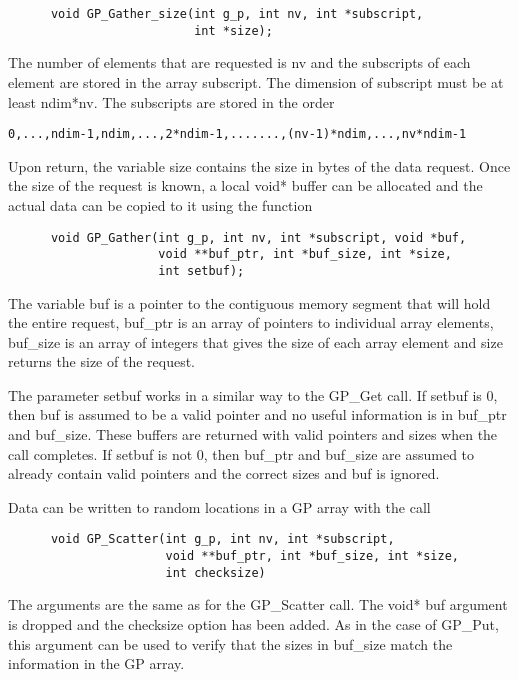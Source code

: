 \begin{verbatim}
      void GP_Gather_size(int g_p, int nv, int *subscript,
                          int *size);
\end{verbatim}

\noindent
The number of elements that are requested is nv and the subscripts of each
element are stored in the array subscript. The dimension of subscript must be at
least ndim*nv. The subscripts are stored in the order

\begin{verbatim}
0,...,ndim-1,ndim,...,2*ndim-1,.......,(nv-1)*ndim,...,nv*ndim-1
\end{verbatim}

\noindent
Upon return, the variable size contains the size in bytes of the data request.
Once the size of the request is known, a local void* buffer can be allocated and
the actual data can be copied to it using the function

\begin{verbatim}
      void GP_Gather(int g_p, int nv, int *subscript, void *buf,
                     void **buf_ptr, int *buf_size, int *size,
                     int setbuf);
\end{verbatim}

\noindent
The variable buf is a pointer to the contiguous memory segment that will hold
the entire request, buf\_ptr is an array of pointers to individual array
elements, buf\_size is an array of integers that gives the size of each array
element and size returns the size of the request.

The parameter setbuf works in a similar way to the GP\_Get call. If setbuf is 0,
then buf is assumed to be a valid pointer and no useful information is in
buf\_ptr and buf\_size. These buffers are returned with valid pointers and sizes
when the call completes. If setbuf is not 0, then buf\_ptr and buf\_size are
assumed to already contain valid pointers and the correct sizes and buf is
ignored.

Data can be written to random locations in a GP array with the call

\begin{verbatim}
      void GP_Scatter(int g_p, int nv, int *subscript,
                      void **buf_ptr, int *buf_size, int *size,
                      int checksize)
\end{verbatim}

\noindent
The arguments are the same as for the GP\_Scatter call. The void* buf argument
is dropped and the checksize option has been added. As in the case of GP\_Put,
this argument can be used to verify that the sizes in buf\_size match the
information in the GP array.

